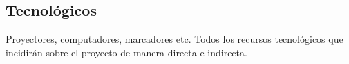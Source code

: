 \subsection{Tecnológicos}
Proyectores, computadores, marcadores etc. Todos los recursos tecnológicos que incidirán sobre el proyecto de manera directa e indirecta.
